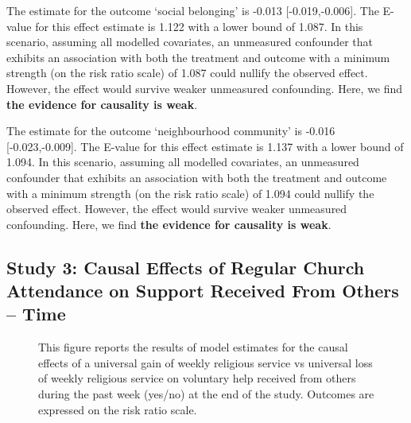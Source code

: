 \documentclass[
  singlecolumn]{article}
\begin{document}
The estimate for the outcome `social belonging' is -0.013
{[}-0.019,-0.006{]}. The E-value for this effect estimate is 1.122 with
a lower bound of 1.087. In this scenario, assuming all modelled
covariates, an unmeasured confounder that exhibits an association with
both the treatment and outcome with a minimum strength (on the risk
ratio scale) of 1.087 could nullify the observed effect. However, the
effect would survive weaker unmeasured confounding. Here, we find
\textbf{the evidence for causality is weak}.

The estimate for the outcome `neighbourhood community' is -0.016
{[}-0.023,-0.009{]}. The E-value for this effect estimate is 1.137 with
a lower bound of 1.094. In this scenario, assuming all modelled
covariates, an unmeasured confounder that exhibits an association with
both the treatment and outcome with a minimum strength (on the risk
ratio scale) of 1.094 could nullify the observed effect. However, the
effect would survive weaker unmeasured confounding. Here, we find
\textbf{the evidence for causality is weak}.

\newpage{}

\subsection{Study 3: Causal Effects of Regular Church Attendance on
Support Received From Others --
Time}\label{study-3-causal-effects-of-regular-church-attendance-on-support-received-from-others-time}

\begin{figure}


\caption{\label{fig-3_1}This figure reports the results of model
estimates for the causal effects of a universal gain of weekly religious
service vs universal loss of weekly religious service on voluntary help
received from others during the past week (yes/no) at the end of the
study. Outcomes are expressed on the risk ratio scale.}

\end{figure}%
\end{document}
